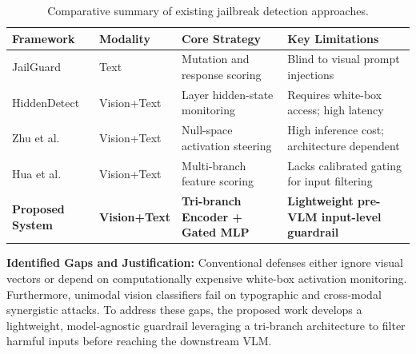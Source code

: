 \begin{table}[H]
\centering
\fontsize{9pt}{11pt}\selectfont
\caption{Comparative summary of existing jailbreak detection approaches.}
\label{tab:literature_summary}
\begin{tabular}{|p{}|p{}|p{}|p{}|}
\hline
\textbf{Framework} & \textbf{Modality} & \textbf{Core Strategy} & \textbf{Key Limitations} \\
\hline
JailGuard \cite{Zhang2025JailGuard} & Text & Mutation and response scoring & Blind to visual prompt injections \\
\hline
HiddenDetect \cite{Jiang2025HiddenDetectDJ} & Vision+Text & Layer hidden-state monitoring & Requires white-box access; high latency \\
\hline
Zhu et al. \cite{Zhu2026PrincipledSV} & Vision+Text & Null-space activation steering & High inference cost; architecture dependent \\
\hline
Hua et al. \cite{hua2026rethinking} & Vision+Text & Multi-branch feature scoring & Lacks calibrated gating for input filtering \\
\hline
\textbf{Proposed System} & \textbf{Vision+Text} & \textbf{Tri-branch Encoder + Gated MLP} & \textbf{Lightweight pre-VLM input-level guardrail} \\
\hline
\end{tabular}
\end{table}

\textbf{Identified Gaps and Justification:} Conventional defenses either ignore visual vectors or depend on computationally expensive white-box activation monitoring. Furthermore, unimodal vision classifiers fail on typographic and cross-modal synergistic attacks. To address these gaps, the proposed work develops a lightweight, model-agnostic guardrail leveraging a tri-branch architecture to filter harmful inputs before reaching the downstream VLM.
